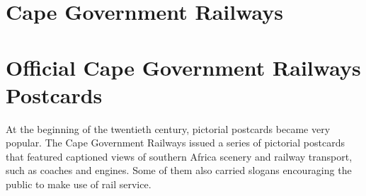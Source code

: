 \section{Cape Government Railways
} 
\section{Official Cape Government Railways Postcards
} 
At the beginning of the twentieth century, pictorial postcards became very popular. The Cape Government Railways issued a series of pictorial postcards that featured captioned views of southern
Africa scenery and railway transport, such as coaches and engines. Some of them also carried slogans encouraging the public to make use of rail service.


	



  